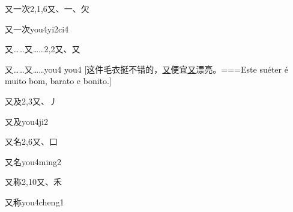 \begin{Entry}{又一次}{2,1,6}{⼜、⼀、⽋}
  \begin{Phonetics}{又一次}{you4yi2ci4}
  \end{Phonetics}
\end{Entry}

\begin{Entry}{又……又……}{2,2}{⼜、⼜}
  \begin{Phonetics}{又……又……}{you4 you4}
    [这件毛衣挺不错的，\underline{又}便宜\underline{又}漂亮。===Este suéter é muito bom, barato e bonito.]
  \end{Phonetics}
\end{Entry}

\begin{Entry}{又及}{2,3}{⼜、⼃}
  \begin{Phonetics}{又及}{you4ji2}
  \end{Phonetics}
\end{Entry}

\begin{Entry}{又名}{2,6}{⼜、⼝}
  \begin{Phonetics}{又名}{you4ming2}
  \end{Phonetics}
\end{Entry}

\begin{Entry}{又称}{2,10}{⼜、⽲}
  \begin{Phonetics}{又称}{you4cheng1}
  \end{Phonetics}
\end{Entry}


